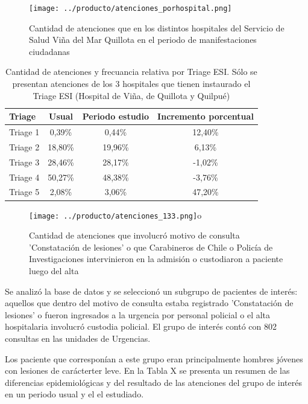 \documentclass{article}
\begin{document}
\begin{figure}[h]
\centering
\texttt{[image: ../producto/atenciones\_porhospital.png]}
\caption{Cantidad de atenciones que en los distintos hospitales del Servicio de Salud Viña del Mar Quillota en el periodo de manifestaciones ciudadanas}
\label{fig:image2}
\end{figure}

\begin{table}[H]
\centering
\begin{tabular}{@{}lccc@{}}
\toprule
\textbf{Triage} & \textbf{Usual} & \textbf{Periodo estudio} & \textbf{Incremento porcentual} \\ \hline
Triage 1        & 0,39\%         & 0,44\%                   & 12,40\%                        \\
Triage 2        & 18,80\%        & 19,96\%                  & 6,13\%                         \\
Triage 3        & 28,46\%        & 28,17\%                  & -1,02\%                        \\
Triage 4        & 50,27\%        & 48,38\%                  & -3,76\%                        \\
Triage 5        & 2,08\%         & 3,06\%                   & 47,20\%                        \\ \hline
\end{tabular}
\caption{Cantidad de atenciones y frecuancia relativa por Triage ESI. Sólo se presentan atenciones de los 3 hospitales que tienen instaurado el Triage ESI (Hospital de Viña, de Quillota y Quilpué)}
\end{table}

\begin{figure}[h]
\centering
\texttt{[image: ../producto/atenciones\_133.png]}o
\caption{Cantidad de atenciones que involucró motivo de consulta 'Constatación de lesiones' o que Carabineros de Chile o Policía de Investigaciones intervinieron en la admisión o custodiaron a paciente luego del alta}
\label{fig:image2}
\end{figure}

Se analizó la base de datos y se seleccionó un subgrupo de pacientes de interés: aquellos que dentro del motivo de consulta estaba registrado 'Constatación de lesiones' o fueron ingresados  a la urgencia por personal policial o el alta hospitalaria involucró custodia policial. El grupo de interés contó con 802 consultas en las unidades de Urgencias.

Los paciente que corresponían a este grupo eran principalmente hombres jóvenes con lesiones de carácterter leve. En la Tabla X se presenta un resumen de las diferencias epidemiológicas y del resultado de las atenciones del grupo de interés en un periodo usual y el el estudiado.
\end{document}
